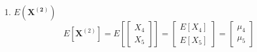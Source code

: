 \begin{enumerate}[label=(\alph*)]
\[\begin{bNiceMatrix}[r]
                \end{bNiceMatrix}
                \begin{bNiceMatrix}[r]
                    4 & -1 & \frac{1}{2} \\
                    -1 & 3 & 1 \\
                    \frac{1}{2} & 1 & 6
                \end{bNiceMatrix}
                \begin{bNiceMatrix}[r]
                    2 & 1 \\
                    -1 & 1 \\
                    0 & 3
                \end{bNiceMatrix}
                =
                \begin{bNiceMatrix}[r]
                    9 & -5 & 0 \\
                    \frac{9}{2} & 5 & \frac{39}{2}
                \end{bNiceMatrix}
                \begin{bNiceMatrix}[r]
                    2 & 1 \\
                    -1 & 1 \\
                    0 & 3
                \end{bNiceMatrix}
                = 
                \begin{bNiceMatrix}[r]
                    23 & 4 \\
                    4 & 68
                \end{bNiceMatrix}
            \]
            \item $E\left(\mathbf{X^{(2)}}\right)$
            \[
                E\left[\mathbf{X}^{(2)}\right]
                = 
                E\left[
                    \begin{bmatrix}
                        X_4 \\
                        X_5
                    \end{bmatrix}
                \right]
                =
                \begin{bmatrix}
                    E[X_4] \\
                    E[X_5]
                \end{bmatrix}
                =
                \begin{bmatrix}
                    \mu_4 \\
                    \mu_5
                \end{bmatrix}
\]
\end{enumerate}
